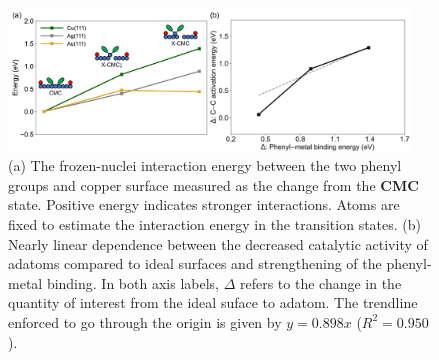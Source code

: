\documentclass[aps,prb,amsmath,amssymb,11pt]{revtex4-1}
\newcommand{\zhzh}{\color{blue}}
\newcommand{\zhzh}{\color{blue}}
\begin{document}

\begin{figure}[bt]
\centering
\includegraphics[width=0.95\textwidth]{Fig/onlysurface.pdf}
\caption{
(a) The frozen-nuclei interaction energy between the two phenyl groups and copper surface measured as the change from the \textbf{CMC} state. Positive energy indicates stronger interactions. Atoms are fixed to estimate the interaction energy in the transition states. (b) Nearly linear dependence between the decreased catalytic activity of adatoms compared to ideal surfaces and strengthening of the phenyl-metal binding. In both axis labels, $\Delta$ refers to the change in the quantity of interest from the ideal suface to adatom. The trendline enforced to go through the origin is given by $y=0.898 x$ ($R^2 = 0.950$).}
\label{fig:onlysurface}
\end{figure}
\end{document}

